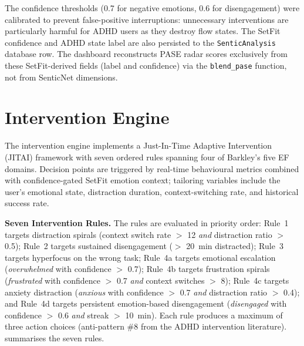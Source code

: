 The confidence thresholds (0.7 for negative emotions, 0.6 for disengagement) were calibrated to prevent false-positive interruptions: unnecessary interventions are particularly harmful for ADHD users as they destroy flow states. The SetFit confidence and ADHD state label are also persisted to the \texttt{SenticAnalysis} database row. The dashboard reconstructs PASE radar scores exclusively from these SetFit-derived fields (label and confidence) via the \texttt{blend\_pase} function, not from SenticNet dimensions.

\section{Intervention Engine}
\label{sec:intervention-engine}

The intervention engine implements a Just-In-Time Adaptive Intervention (JITAI) framework with seven ordered rules spanning four of Barkley's five EF domains. Decision points are triggered by real-time behavioural metrics combined with confidence-gated SetFit emotion context; tailoring variables include the user's emotional state, distraction duration, context-switching rate, and historical success rate.

\textbf{Seven Intervention Rules.} The rules are evaluated in priority order: Rule~1 targets distraction spirals (context switch rate $>$ 12 \emph{and} distraction ratio $>$ 0.5); Rule~2 targets sustained disengagement ($>$ 20~min distracted); Rule~3 targets hyperfocus on the wrong task; Rule~4a targets emotional escalation (\emph{overwhelmed} with confidence $>$ 0.7); Rule~4b targets frustration spirals (\emph{frustrated} with confidence $>$ 0.7 \emph{and} context switches $>$ 8); Rule~4c targets anxiety distraction (\emph{anxious} with confidence $>$ 0.7 \emph{and} distraction ratio $>$ 0.4); and Rule~4d targets persistent emotion-based disengagement (\emph{disengaged} with confidence $>$ 0.6 \emph{and} streak $>$ 10~min). Each rule produces a maximum of three action choices (anti-pattern \#8 from the ADHD intervention literature).  summarises the seven rules.

